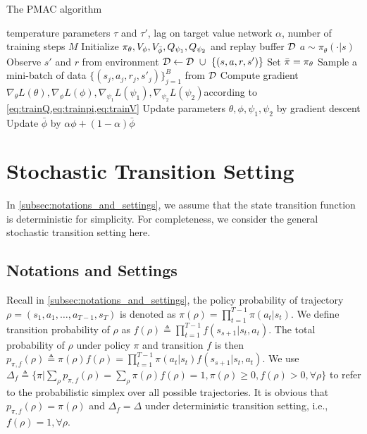 \begin{algorithm}[t]
	\caption{\label{alg:rmac}  The PMAC algorithm}
	\begin{algorithmic}[1]
		\INPUT temperature parameters $\tau$ and $\tau'$, lag on target value network $\alpha$, number of training steps $M$
		\STATE Initialize $\pi_{\theta}, V_{\phi}, V_{\bar{\phi}}, Q_{\psi_1}, Q_{\psi_2}$ and replay buffer ${\mathcal{D}}$
			\STATE $a\sim \pi_\theta(\cdot | s)$
			\STATE Observe $s'$ and $r$ from environment
			\STATE $\gD \leftarrow \gD\ \cup\ \left\{ \left(s, a, r, s'\right) \right\}$
			\ENDFOR
			\STATE Set $\bar{\pi} = \pi_{\theta}$
			\STATE Sample a mini-batch of data $\{ (s_j, a_j, r_j, s'_j) \}_{j=1}^B$ from ${\mathcal{D}}$
			\STATE Compute gradient $\nabla_\theta L(\theta), \nabla_\phi L(\phi), \nabla_{\psi_1} L(\psi_1),  \nabla_{\psi_2} L(\psi_2)$according to \cref{eq:trainQ,eq:trainpi,eq:trainV}
			\STATE Update parameters $\theta, \phi, \psi_1, \psi_2$ by gradient descent
			\STATE Update $\bar{\phi}$ by $\alpha \phi + (1-\alpha) \bar{\phi}$
			\ENDFOR
		\ENDFOR
	\end{algorithmic}
\end{algorithm}

\section{Stochastic Transition Setting}
\label{sec:stochasticsetting}
In \cref{subsec:notations_and_settings}, we assume that the state transition function is deterministic for simplicity. For completeness, we consider the general stochastic transition setting here.

\subsection{Notations and Settings}

Recall in \cref{subsec:notations_and_settings}, the policy probability of trajectory $\rho=(s_1, a_1, \dots, a_{T-1}, s_T)$ is denoted as $\pi(\rho) = \prod_{t=1}^{T-1} \pi(a_t| s_t)$. We define transition probability of $\rho$ as $f(\rho) \triangleq \prod_{t=1}^{T-1}{ f(s_{s+1} | s_t, a_t)}$. The total probability of $\rho$ under policy $\pi$ and transition $f$ is then $p_{\pi, f}(\rho) \triangleq \pi(\rho) f(\rho) = \prod_{t=1}^{T-1}{ \pi(a_t | s_t) f(s_{s+1} | s_t, a_t)}$. We use $\Delta_{f} \triangleq \{ \pi | \sum_{\rho}{ p_{\pi, f}(\rho) } = \sum_{\rho}{\pi(\rho) f(\rho)} = 1, \pi(\rho) \ge 0, f(\rho) > 0, \forall \rho \}$ to refer to the probabilistic simplex over all possible trajectories. It is obvious that $p_{\pi, f}(\rho) = \pi(\rho)$ and $\Delta_f = \Delta$ under deterministic transition setting, i.e., $f(\rho) = 1, \forall \rho$.

